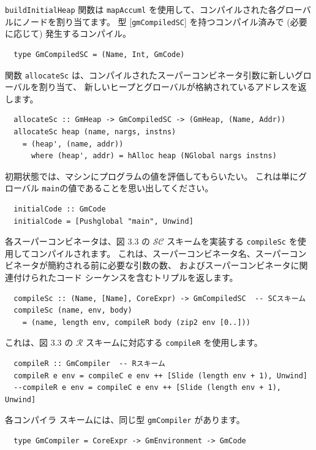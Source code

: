 \documentclass{jbook}
\begin{document}
\texttt{buildInitialHeap} 関数は \texttt{mapAccuml} を使用して、コンパイルされた各グローバルにノードを割り当てます。
型 [\texttt{gmCompiledSC}] を持つコンパイル済みで (必要に応じて) 発生するコンパイル。

\begin{verbatim}
  type GmCompiledSC = (Name, Int, GmCode)
\end{verbatim}

関数 \texttt{allocateSc} は、コンパイルされたスーパーコンビネータ引数に新しいグローバルを割り当て、
新しいヒープとグローバルが格納されているアドレスを返します。

\begin{verbatim}
  allocateSc :: GmHeap -> GmCompiledSC -> (GmHeap, (Name, Addr))
  allocateSc heap (name, nargs, instns)
    = (heap', (name, addr))
      where (heap', addr) = hAlloc heap (NGlobal nargs instns)
\end{verbatim}

初期状態では、マシンにプログラムの値を評価してもらいたい。
これは単にグローバル \texttt{main}の値であることを思い出してください。

\begin{verbatim}
  initialCode :: GmCode
  initialCode = [Pushglobal "main", Unwind]
\end{verbatim}

各スーパーコンビネータは、図 3.3 の $\mathcal{SC}$ スキームを実装する \texttt{compileSc} を使用してコンパイルされます。
これは、スーパーコンビネータ名、スーパーコンビネータが簡約される前に必要な引数の数、
およびスーパーコンビネータに関連付けられたコード シーケンスを含むトリプルを返します。

\begin{verbatim}
  compileSc :: (Name, [Name], CoreExpr) -> GmCompiledSC  -- SCスキーム
  compileSc (name, env, body)
    = (name, length env, compileR body (zip2 env [0..]))
\end{verbatim}

これは、図 3.3 の $\mathcal{R}$ スキームに対応する \texttt{compileR} を使用します。

\begin{verbatim}
  compileR :: GmCompiler  -- Rスキーム
  compileR e env = compileC e env ++ [Slide (length env + 1), Unwind]
  --compileR e env = compileC e env ++ [Slide (length env + 1), Unwind]
\end{verbatim}

各コンパイラ スキームには、同じ型 \texttt{gmCompiler} があります。

\begin{verbatim}
  type GmCompiler = CoreExpr -> GmEnvironment -> GmCode
\end{verbatim}
\end{document}
